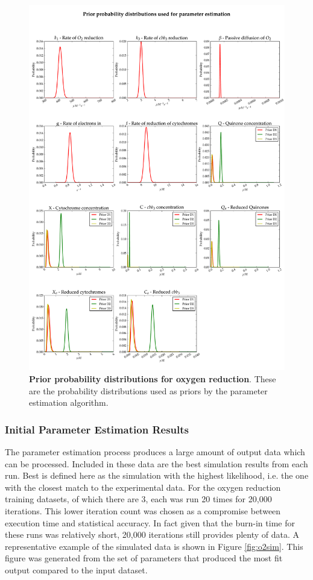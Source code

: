 \begin{figure}[p]
 \centering
 \includegraphics[width=15cm, trim=0cm 0cm 0cm 0cm]{./05-oxygenreduction/data/priors1.pdf}
 \caption[Prior probability distributions for oxygen reduction]{{\bf Prior probability distributions for oxygen reduction}. These are the probability distributions used as priors by the parameter estimation algorithm.
 \label{fig:oxypriors}}
\end{figure}
\afterpage{\clearpage}

\subsubsection{Initial Parameter Estimation Results}
The parameter estimation process produces a large amount of output data which can be processed. Included in these data are the best simulation results from each run. Best is defined here as the simulation with the highest likelihood, i.e. the one with the closest match to the experimental data. For the oxygen reduction training datasets, of which there are 3, each was run 20 times for 20,000 iterations. This lower iteration count was chosen as a compromise between execution time and statistical accuracy. In fact given that the burn-in time for these runs was relatively short, 20,000 iterations still provides plenty of data. A representative example of the simulated data is shown in Figure \ref{fig:o2sim}. This figure was generated from the set of parameters that produced the most fit output compared to the input dataset.

